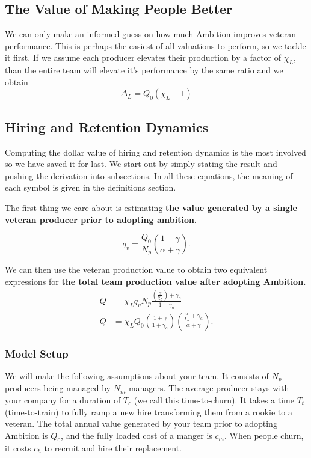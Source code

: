 \documentclass[paper=a4, fontsize=11pt abstract]{scrartcl}
\numberwithin{equation}{section}		%
\numberwithin{figure}{section}			%
\numberwithin{table}{section}				%
\begin{document}
\subsection{The Value of Making People Better}
We can only make an informed guess on how much Ambition improves veteran performance.
This is perhaps the easiest of all valuations to perform, so we tackle it first.  If we assume each producer elevates their production by a factor of $\chi_L$, than the entire team will elevate it's performance by the same ratio and we obtain
\begin{equation}
    \Delta_L = Q_0\left(\chi_L - 1\right)
\end{equation}








\subsection{Hiring and Retention Dynamics}
Computing the dollar value of hiring and retention dynamics is the most involved so we have saved it for last.  We start out by simply stating the result and pushing the derivation into subsections. In all these equations, the meaning of each symbol is given in the definitions section.

The first thing we care about is estimating \textbf{the value generated by a single veteran producer prior to adopting ambition.}

\begin{equation}
    q_{v} = \frac{Q_0}{N_p}\left(\frac{1 + \gamma}{\alpha + \gamma}\right).
\end{equation}

We can then use the veteran production value to obtain two equivalent expressions for \textbf{the total team production value after adopting Ambition.}
\begin{align}
    Q &= \chi_L q_{v} N_p\frac{\left(\frac{\alpha}{\chi_L}\right) + \gamma_a}{1 + \gamma_a} \label{Q0} \\
    Q &= \chi_L Q_0  \left(\frac{1+\gamma}{1 + \gamma_a}\right) \left(\frac{\frac{\alpha}{\chi_L} + \gamma_a  }{\alpha + \gamma}\right).
\end{align}

\subsubsection{Model Setup}
We will make the following assumptions about your team.  It consists of $N_p$ producers being managed by $N_m$ managers.  The average producer stays with your company for a duration of $T_c$ (we call this time-to-churn).  It takes a time $T_t$ (time-to-train) to fully ramp a new hire transforming them from a rookie to a veteran. The total annual value generated by your team prior to adopting Ambition is $Q_0$, and the fully loaded cost of a manger is $c_m$.  When people churn, it costs $c_h$ to recruit and hire their replacement.
\end{document}
